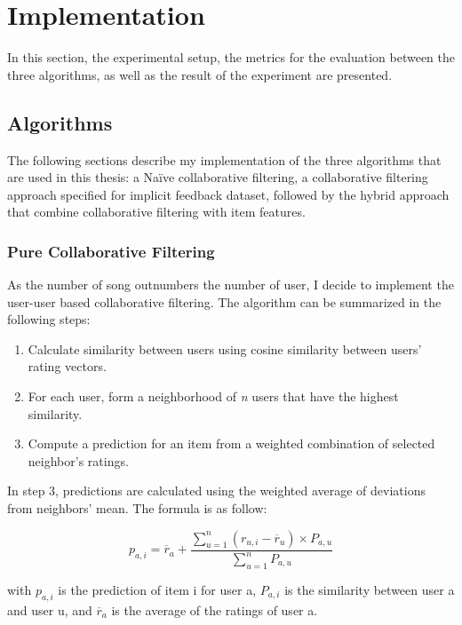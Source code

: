 \chapter{Implementation} %

\label{Chapter4}

In this section, the experimental setup, the metrics for the evaluation between the three algorithms, as well as the result of the experiment are presented.

\section{Algorithms}

The following sections describe my implementation of the three algorithms that are used in this thesis: a Na\"ive collaborative filtering, a collaborative filtering approach specified for implicit feedback dataset, followed by the hybrid approach that combine collaborative filtering with item features.

\subsection{Pure Collaborative Filtering}
As the number of song outnumbers the number of user, I decide to implement the user-user based collaborative filtering. The algorithm can be summarized in the following steps:

\begin{enumerate}
	\item Calculate similarity between users using cosine similarity between users' rating vectors. 
	\item For each user, form a neighborhood of \textit{n} users that have the highest similarity.
	\item Compute a prediction for an item from a weighted combination of selected neighbor's ratings. 
\end{enumerate}

In step 3, predictions are calculated using the weighted average of deviations from neighbors' mean. The formula is as follow:

\begin{displaymath}
p_{a,i} = \overline{r}_a + \frac{\sum_{u=1}^{n} (r_{u,i} - \overline{r}_{u}) \times P_{a,u}}{\sum_{u=1}^{n} P_{a,u}}  \tag{1} 
\end{displaymath}

with \(p_{a,i} \) is the prediction of item i for user a, \(P_{a,i}\) is the similarity between user a and user u, and \(\overline{r}_a\) is the average of the ratings of user a.  

